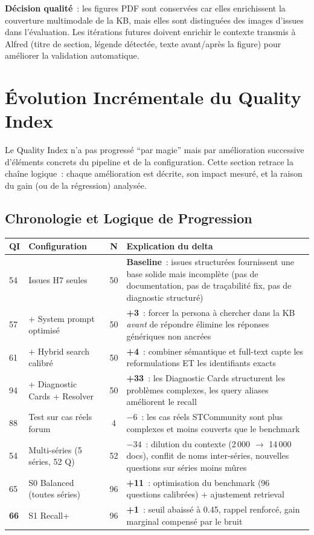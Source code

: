\textbf{Décision qualité}~: les figures PDF sont conservées car elles enrichissent la couverture multimodale de la KB, mais elles sont distinguées des images d'issues dans l'évaluation. Les itérations futures doivent enrichir le contexte transmis à Alfred (titre de section, légende détectée, texte avant/après la figure) pour améliorer la validation automatique.

\section{Évolution Incrémentale du Quality Index}
\label{sec:evolution_incrementale}

Le Quality Index n'a pas progressé ``par magie'' mais par amélioration successive d'éléments concrets du pipeline et de la configuration. Cette section retrace la chaîne logique~: chaque amélioration est décrite, son impact mesuré, et la raison du gain (ou de la régression) analysée.

\subsection{Chronologie et Logique de Progression}

\begin{longtable}{p{0.8cm}p{3.5cm}cp{6cm}}
\toprule
\textbf{QI} & \textbf{Configuration} & \textbf{N} & \textbf{Explication du delta} \\
\midrule
54 & Issues H7 seules & 50 & \textbf{Baseline}~: issues structurées fournissent une base solide mais incomplète (pas de documentation, pas de traçabilité fix, pas de diagnostic structuré) \\
57 & + System prompt optimisé & 50 & \textbf{+3}~: forcer la persona à chercher dans la KB \textit{avant} de répondre élimine les réponses génériques non ancrées \\
61 & + Hybrid search calibré & 50 & \textbf{+4}~: combiner sémantique et full-text capte les reformulations ET les identifiants exacts \\
94 & + Diagnostic Cards + Resolver & 50 & \textbf{+33}~: les Diagnostic Cards structurent les problèmes complexes, les query aliases améliorent le recall \\
88 & Test sur cas réels forum & 4 & \textbf{$-6$}~: les cas réels STCommunity sont plus complexes et moins couverts que le benchmark \\
54 & Multi-séries (5 séries, 52 Q) & 52 & \textbf{$-34$}~: dilution du contexte (2\,000 $\to$ 14\,000 docs), conflit de noms inter-séries, nouvelles questions sur séries moins mûres \\
65 & S0 Balanced (toutes séries) & 96 & \textbf{+11}~: optimisation du benchmark (96 questions calibrées) + ajustement retrieval \\
\textbf{66} & S1 Recall+ & 96 & \textbf{+1}~: seuil abaissé à 0.45, rappel renforcé, gain marginal compensé par le bruit \\
\bottomrule
\end{longtable}


